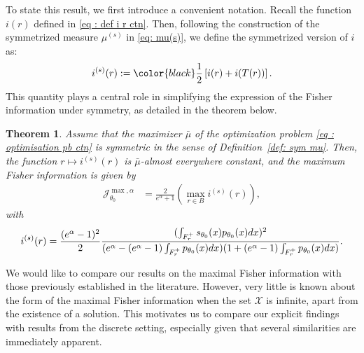 \documentclass[a4paper, 11pt]{article}
\newtheorem{thm}{Theorem}
\theoremstyle{definition}
\newcommand{\modar}{\color{black}}
\begin{document}
{To state this result, we first introduce a convenient notation. Recall the function $i(r)$ defined in \eqref{eq : def i r ctn}. Then, following the construction of the symmetrized measure $\mu^{(s)}$ in \eqref{eq: mu(s)}, we define the symmetrized version of $i$ as:
\begin{equation}\label{eq: i(s) r}
	i^{(s)}(r) := {\modar \frac{1}{2}} \left[ i(r) + i(T(r)) \right].
\end{equation}
This quantity plays a central role in simplifying the expression of the Fisher information under symmetry, as detailed in the theorem below.

\begin{thm}\label{thm: Fisher sym}
Assume that the maximizer $\bar{\mu}$ of the optimization problem \eqref{eq : optimisation pb ctn} is symmetric in the sense of Definition~\ref{def: sym mu}. Then, the function $r \mapsto i^{(s)}(r)$ is $\bar{\mu}$-almost everywhere constant, and the maximum Fisher information is given by
\begin{align*}
\mathcal{J}_{\theta_0}^{\max, \alpha} &= \frac{2}{e^\alpha + 1} (\max_{r \in B} i^{(s)}(r)), 
\end{align*}
with
\begin{equation}{\label{eq: i(s)r}}
i^{(s)}(r) = \frac{(e^\alpha - 1)^2}{2} \frac{(\int_{F_r^+}s_{\theta_0}(x)p_{\theta_0}(x) dx)^2}{(e^\alpha  -(e^\alpha - 1) \int_{F_r^+}p_{\theta_0}(x)dx)(1 + (e^\alpha - 1) \int_{F_r^+}p_{\theta_0}(x)dx)}.
\end{equation}
\end{thm}


We would like to compare our results on the maximal Fisher information with those previously established in the literature. However, very little is known about the form of the maximal Fisher information when the set $\mathcal{X}$ is infinite, apart from the existence of a solution. This motivates us to compare our explicit findings with results from the discrete setting, especially given that several similarities are immediately apparent. 


}
\end{document}

